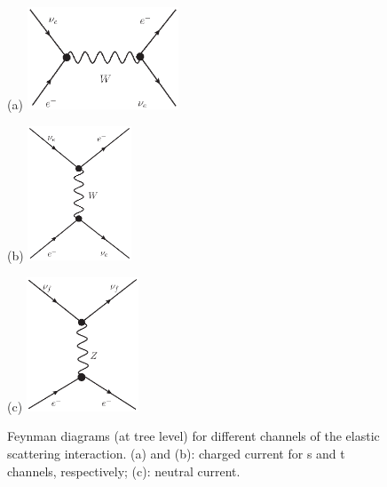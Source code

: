 \begin{figure}[htbp]
	\centering
	\begin{minipage}[t]{0.45\textwidth}{(a)}
		\centering
		\includegraphics[width=4.5cm]{charged-1.eps}
	\end{minipage}
	\begin{minipage}[t]{0.3\textwidth}{(b)}
		\centering
		\includegraphics[height=4cm]{charged.eps}
	\end{minipage}
	\begin{minipage}[t]{0.4\textwidth}{(c)}
	\centering
	\includegraphics[height=4cm]{neutral.eps}
\end{minipage}
	\caption{Feynman diagrams (at tree level) for different channels of the elastic scattering interaction. (a) and (b): charged current for s and t channels, respectively; (c): neutral current.}
	\label{feynman-es}
\end{figure}


